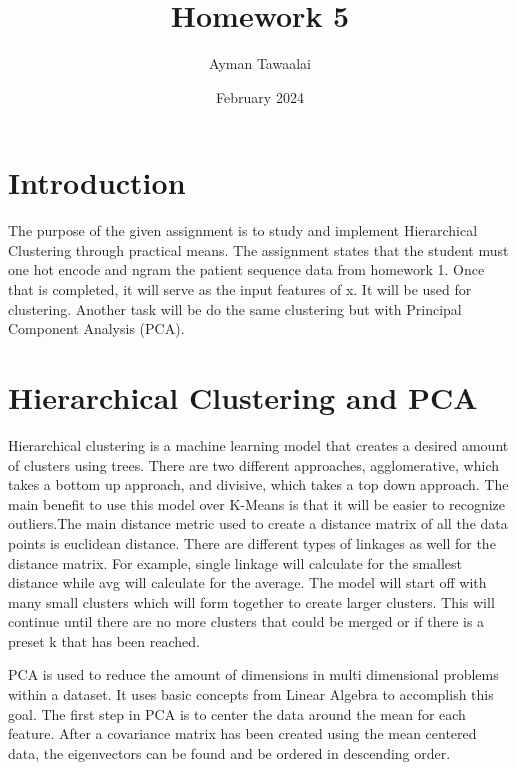 \documentclass{article}
\title{Homework 5}
\author{Ayman Tawaalai}
\date{February 2024}
\begin{document}
\maketitle

\section{Introduction}
The purpose of the given assignment is to study and implement Hierarchical Clustering through practical means. The assignment states that the student must one hot encode and ngram the patient sequence data from homework 1. Once that is completed, it will serve as the input features of x. It will be used for clustering. Another task will be do the same clustering but with Principal Component Analysis (PCA).

\section{Hierarchical Clustering and PCA}
Hierarchical clustering is a machine learning model that creates a desired amount of clusters using trees. There are two different approaches, agglomerative, which takes a bottom up approach, and divisive, which takes a top down approach. The main benefit to use this model over K-Means is that it will be easier to recognize outliers.The main distance metric used to create a distance matrix of all the data points is euclidean distance. There are different types of linkages as well for the distance matrix. For example, single linkage will calculate for the smallest distance while avg will calculate for the average. The model will start off with many small clusters which will form together to create larger clusters. This will continue until there are no more clusters that could be merged or if there is a preset k that has been reached.

PCA is used to reduce the amount of dimensions in multi dimensional problems within a dataset. It uses basic concepts from Linear Algebra to accomplish this goal. The first step in PCA is to center the data around the mean for each feature. After a covariance matrix has been created using the mean centered data, the eigenvectors can be found and be ordered in descending order.
\end{document}
